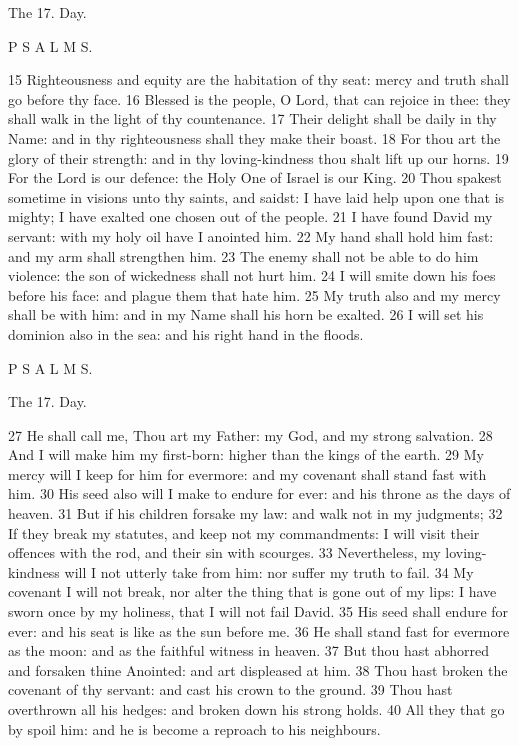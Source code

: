 The 17. Day.

P S A L M S.

15 Righteousness and equity are the habitation of thy seat: mercy and truth shall go before thy face. 16 Blessed is the people, O Lord, that can rejoice in thee: they shall walk in the light of thy countenance. 17 Their delight shall be daily in thy Name: and in thy righteousness shall they make their boast. 18 For thou art the glory of their strength: and in thy loving-kindness thou shalt lift up our horns. 19 For the Lord is our defence: the Holy One of Israel is our King. 20 Thou spakest sometime in visions unto thy saints, and saidst: I have laid help upon one that is mighty; I have exalted one chosen out of the people. 21 I have found David my servant: with my holy oil have I anointed him. 22 My hand shall hold him fast: and my arm shall strengthen him. 23 The enemy shall not be able to do him violence: the son of wickedness shall not hurt him. 24 I will smite down his foes before his face: and plague them that hate him. 25 My truth also and my mercy shall be with him: and in my Name shall his horn be exalted. 26 I will set his dominion also in the sea: and his right hand in the floods.

P S A L M S.

The 17. Day.

27 He shall call me, Thou art my Father: my God, and my strong salvation. 28 And I will make him my first-born: higher than the kings of the earth. 29 My mercy will I keep for him for evermore: and my covenant shall stand fast with him. 30 His seed also will I make to endure for ever: and his throne as the days of heaven. 31 But if his children forsake my law: and walk not in my judgments; 32 If they break my statutes, and keep not my commandments: I will visit their offences with the rod, and their sin with scourges. 33 Nevertheless, my loving-kindness will I not utterly take from him: nor suffer my truth to fail. 34 My covenant I will not break, nor alter the thing that is gone out of my lips: I have sworn once by my holiness, that I will not fail David. 35 His seed shall endure for ever: and his seat is like as the sun before me. 36 He shall stand fast for evermore as the moon: and as the faithful witness in heaven. 37 But thou hast abhorred and forsaken thine Anointed: and art displeased at him. 38 Thou hast broken the covenant of thy servant: and cast his crown to the ground. 39 Thou hast overthrown all his hedges: and broken down his strong holds. 40 All they that go by spoil him: and he is become a reproach to his neighbours.


